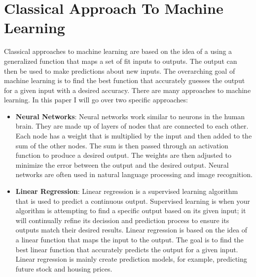 \documentclass[12pt]{article}
\begin{document}
\section*{Classical Approach To Machine Learning}
Classical approaches to machine learning are based on the idea of a using a generalized function that maps a set of fit inputs to outputs. The output can then be used to make predictions about new inputs. The overarching goal of machine learning is to find the best function that accurately guesses the output for a given input with a desired accuracy. There are many approaches to machine learning. In this paper I will go over two specific approaches: 
\begin{itemize}
\item \textbf{Neural Networks}: Neural networks work similar to neurons in the human brain. They are made up of layers of nodes that are connected to each other. Each node has a weight that is multiplied by the input and then added to the sum of the other nodes. The sum is then passed through an activation function to produce a desired output. The weights are then adjusted to minimize the error between the output and the desired output. Neural networks are often used in natural language processing and image recognition.
\item \textbf{Linear Regression}: Linear regression is a supervised learning algorithm that is used to predict a continuous output. Supervised learning is when your algorithm is attempting to find a specific output based on its given input; it will continually refine its decission and prediction process to ensure its outputs match their desired results. Linear regression is based on the idea of a linear function that maps the input to the output. The goal is to find the best linear function that accurately predicts the output for a given input. Linear regression is mainly create prediction models, for example, predicting future stock and housing prices.

\end{itemize}
\end{document}
